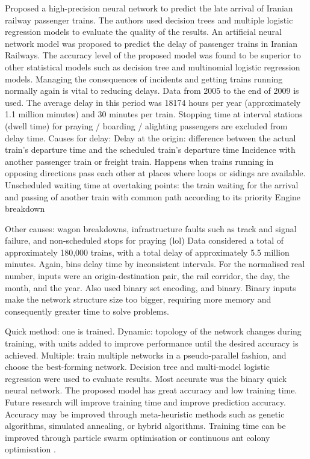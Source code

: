 \documentclass{article}
\begin{document}
Proposed a high-precision neural network to predict the late arrival of Iranian railway passenger trains. The authors used decision trees and multiple logistic regression models to evaluate the quality of the results.
An artificial neural network model was proposed to predict the delay of passenger trains in Iranian Railways. The accuracy level of the proposed model was found to be superior to other statistical models such as decision tree and multinomial logistic regression models.
Managing the consequences of incidents and getting trains running normally again is vital to reducing delays.
Data from 2005 to the end of 2009 is used. The average delay in this period was 18174 hours per year (approximately 1.1 million minutes) and 30 minutes per train. Stopping time at interval stations (dwell time) for praying / boarding / alighting passengers are excluded from delay time. Causes for delay:
Delay at the origin: difference between the actual train’s departure time and the scheduled train’s departure time
Incidence with another passenger train or freight train. Happens when trains running in opposing directions pass each other at places where loops or sidings are available. 
Unscheduled waiting time at overtaking points: the train waiting for the arrival and passing of another train with common path according to its priority
Engine breakdown

Other causes: wagon breakdowns, infrastructure faults such as track and signal failure, and non-scheduled stops for praying (lol)
Data considered a total of approximately 180,000 trains, with a total delay of approximately 5.5 million minutes. Again, bins delay time by inconsistent intervals. For the normalised real number, inputs were an origin-destination pair, the rail corridor, the day, the month, and the year. Also used binary set encoding, and binary. Binary inputs make the network structure size too bigger, requiring more memory and consequently greater time to solve problems. 

Quick method: one is trained. Dynamic: topology of the network changes during training, with units added to improve performance until the desired accuracy is achieved. Multiple: train multiple networks in a pseudo-parallel fashion, and choose the best-forming network. Decision tree and multi-model logistic regression were used to evaluate results. 
Most accurate was the binary quick neural network. The proposed model has great accuracy and low training time. Future research will improve training time and improve prediction accuracy. Accuracy may be improved through meta-heuristic methods such as genetic algorithms, simulated annealing, or hybrid algorithms. Training time can be improved through particle swarm optimisation or continuous ant colony optimisation .
\end{document}
